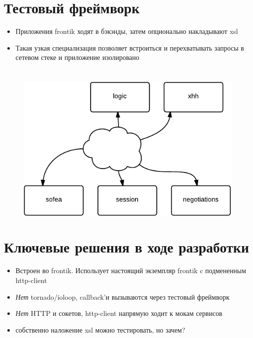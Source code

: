 \documentclass[12pt]{article}
\begin{document}
\section{Тестовый фреймворк}

\begin{itemize}
\item Приложения frontik ходят в бэкэнды, затем опционально накладывают xsl
\item Такая узкая специализация позволяет встроиться и перехватывать запросы в сетевом стеке и приложение изолировано

\end{itemize}

\section{}
\begin{figure}
\includegraphics[page=1, scale=2]{interconnection.pdf}
%
\end{figure}

\section{Ключевые решения в ходе разработки}

\begin{itemize}
\item Встроен во frontik. Использует настоящий экземпляр frontik c подмененным http-client
\item \emph{Нет} tornado/ioloop, callback'и вызываются через тестовый фреймворк
\item \emph{Нет} HTTP и сокетов, http-client напрямую ходит к мокам сервисов
\item собственно наложение xsl можно тестировать, но зачем?

\end{itemize}
\end{document}
